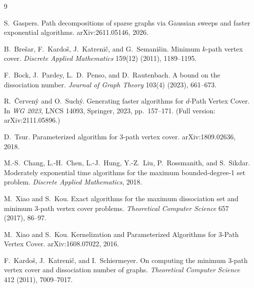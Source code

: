 \documentclass[11pt]{article}
\begin{document}
\begin{thebibliography}{9}

S.~Gaspers.
Path decompositions of sparse graphs via Gaussian sweeps and faster exponential
algorithms.
arXiv:2611.05146, 2026.

B.~Bre\v{s}ar, F.~Kardo\v{s}, J.~Katreni\v{c}, and G.~Semani\v{s}in.
Minimum $k$-path vertex cover.
\emph{Discrete Applied Mathematics} 159(12) (2011), 1189--1195.

F.~Bock, J.~Pardey, L.~D.~Penso, and D.~Rautenbach.
A bound on the dissociation number.
\emph{Journal of Graph Theory} 103(4) (2023), 661--673.

R.~\v{C}erven\'y and O.~Such\'y.
Generating faster algorithms for $d$-Path Vertex Cover.
In \emph{WG 2023}, LNCS 14093, Springer, 2023, pp.~157--171.
(Full version: arXiv:2111.05896.)

D.~Tsur.
Parameterized algorithm for 3-path vertex cover.
arXiv:1809.02636, 2018.

M.-S.~Chang, L.-H.~Chen, L.-J.~Hung, Y.-Z.~Liu, P.~Rossmanith, and S.~Sikdar.
Moderately exponential time algorithms for the maximum bounded-degree-1 set problem.
\emph{Discrete Applied Mathematics}, 2018.

M.~Xiao and S.~Kou.
Exact algorithms for the maximum dissociation set and minimum 3-path vertex cover
problems.
\emph{Theoretical Computer Science} 657 (2017), 86--97.

M.~Xiao and S.~Kou.
Kernelization and Parameterized Algorithms for 3-Path Vertex Cover.
arXiv:1608.07022, 2016.

F.~Kardo\v{s}, J.~Katreni\v{c}, and I.~Schiermeyer.
On computing the minimum 3-path vertex cover and dissociation number of graphs.
\emph{Theoretical Computer Science} 412 (2011), 7009--7017.

\end{thebibliography}
\end{document}
